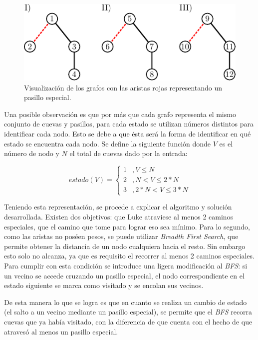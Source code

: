 	\begin{figure}[H]
		\centering
		\includegraphics{imagenes/ej1_modelo_1.pdf}
		\caption{Visualización de los grafos con las aristas rojas representando un pasillo especial.}
		\label{ej1:fig_1}
	\end{figure}

	Una posible observación es que por más que cada grafo representa el mismo
	conjunto de cuevas y pasillos, para cada estado se utilizan
	números distintos para identificar cada nodo. Esto se debe a que ésta será
	la forma de identificar en qué estado se encuentra cada nodo. Se define la
	siguiente función donde $V$ es el número de nodo y $N$ el total de cuevas
	dado por la entrada:

	\begin{equation*}
		estado(V) =
		\begin{cases}
			1 & , V \leq N \\
			2 & , N < V \leq 2 * N \\
			3 & , 2 * N < V \leq 3 * N
		\end{cases}
	\end{equation*}

	Teniendo esta representación, se procede a explicar el algoritmo y
	solución desarrollada. Existen dos objetivos: que Luke atraviese al menos 2
	caminos especiales, que el camino que tome para lograr eso sea mínimo. Para
	lo segundo, como las aristas no poséen pesos, se puede utilizar
	\emph{Breadth First Search}, que permite obtener la distancia de un nodo
	cualquiera hacia el resto. Sin embargo esto solo no alcanza, ya que es
	requisito el recorrer al menos 2 caminos especiales. Para cumplir con esta
	condición se introduce una ligera modificación al \emph{BFS}: si un vecino
	se accede cruzando un pasillo especial, el nodo correspondiente en el estado
	siguiente se marca como visitado y se encolan sus vecinos.

	De esta manera lo que se logra es que en cuanto se realiza un cambio de
	estado (el salto a un vecino mediante un pasillo especial), se permite que
	el \emph{BFS} recorra cuevas que ya había visitado, con la diferencia de que
	cuenta con el hecho de que atravesó al menos un pasillo especial.

